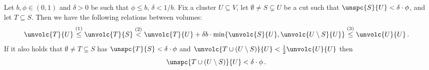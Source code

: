 \begin{lemma}
	\label{lem:relationsvol}
	Let $b, \phi \in (0,1)$ and $\delta > 0$ be such that $\phi \le b$, $\delta < 1/b$. Fix a cluster $U \subseteq V$, let $\emptyset \neq S \subsetneq U$ be a cut such that $\unspc{S}{U}<\delta \cdot \phi$, and let $T \subseteq S$. Then we have the following relations between volumes:
	\begin{equation*}
		\unvolc{T}{U} \overset{(1)}{\le} \unvolc{T}{S} \overset{(2)}{<} \unvolc{T}{U}+\delta b \cdot \min\{\unvolc{S}{U}, \unvolc{U \setminus S}{U}\}   \overset{(3)}{\le} \unvolc{U}{U}\, .
	\end{equation*}
	If it also holds that $\emptyset \neq T \subsetneq S$ has $\unspc{T}{S} < \delta \cdot \phi$ and $\unvolc{T \cup (U \setminus S)}{U} < \frac{1}{2} \unvolc{U}{U}$ then
	\begin{equation*}
		\unspc{T \cup (U \setminus S)}{U} < \delta \cdot \phi \, .
	\end{equation*}
\end{lemma}

